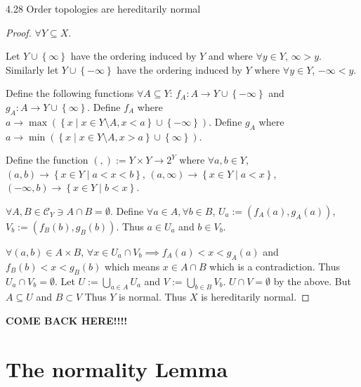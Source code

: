 \documentclass{article}
\begin{document}
\begin{claim}{4.28}\label{Claim 4.28.}
    Order topologies are hereditarily normal
\end{claim}
\begin{proof}
    $\forall Y \subseteq X$. 

    Let $Y \cup \left\{ \infty \right\}$ have the ordering induced by $Y$ and where $\forall y \in Y$, $\infty > y$. Similarly let $Y \cup \left\{ -\infty \right\}$ have the ordering induced by $Y$ where $\forall y \in Y$, $-\infty < y$.      
    
    Define the following functions $\forall A \subseteq Y$: $f_A : A \to Y \cup \left\{ -\infty \right\}$ and $g_A: A \to Y \cup \left\{ \infty \right\}$. Define $f_A$ where $a \to \max\left(\left\{ x \mid x \in Y \setminus A, x < a \right\}\cup \left\{ -\infty \right\}\right)$. Define $g_A$ where $a \to \min\left(\left\{ x \mid x \in Y \setminus A, x > a \right\} \cup \left\{ \infty \right\}\right)$. 
    
    Define the function $(,) := Y \times Y \to 2^Y$ where $\forall a, b \in Y$, $(a, b) \to \left\{ x \in Y \mid a < x < b \right\}$, $(a, \infty) \to \left\{ x \in Y \mid a < x \right\}$, $(-\infty, b) \to \left\{ x \in Y \mid b < x \right\}$. 
    
    $\forall A, B \in \mathcal{C}_Y \ni A \cap B = \emptyset$. Define $\forall a \in A, \forall b \in B$, $U_a := (f_A(a), g_A(a))$, $V_b := (f_B(b), g_B(b))$. Thus $a \in U_a$ and $b \in V_b$. 
    
    $\forall (a, b) \in A \times B$, $\forall x \in U_a \cap V_b \implies f_A(a) < x < g_A(a)$ and $f_B(b) < x < g_B(b)$ which means $x \in A \cap B$ which is a contradiction. Thus $U_a \cap V_b = \emptyset$. Let $U := \bigcup_{a \in A} U_a$ and $V := \bigcup_{b \in B} V_b$. $U \cap V = \emptyset$ by the above. But $A \subseteq U$ and $B \subset V$   Thus $Y$ is normal. Thus $X$ is hereditarily normal.            
\end{proof}

\pagebreak

\textbf{COME BACK HERE!!!!}
\section{The normality Lemma}
\end{document}

